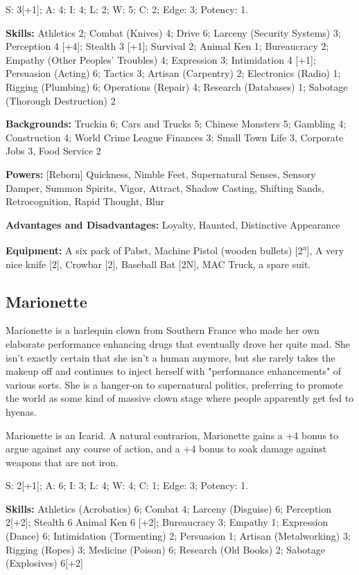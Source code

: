 S: 3[+1]; A: 4; I: 4; L: 2; W: 5; C: 2; Edge: 3; Potency: 1.

\textbf{Skills:} Athletics 2; Combat (Knives) 4; Drive 6; Larceny (Security Systems) 3; Perception 4 [+4]; Stealth 3 [+1]; Survival 2; Animal Ken 1; Bureaucracy 2; Empathy (Other Peoples' Troubles) 4; Expression  3; Intimidation 4 [+1]; Persuasion (Acting) 6; Tactics 3; Artisan (Carpentry) 2; Electronics (Radio) 1; Rigging (Plumbing) 6; Operations (Repair) 4; Research (Databases) 1; Sabotage (Thorough Destruction) 2

\textbf{Backgrounds:} Truckin 6; Cars and Trucks 5; Chinese Monsters 5; Gambling 4; Construction 4; World Crime League Finances 3; Small Town Life 3, Corporate Jobs 3, Food Service 2

\textbf{Powers:} [Reborn] Quickness, Nimble Feet, Supernatural Senses, Sensory Damper, Summon Spirits, Vigor, Attract, Shadow Casting, Shifting Sands, Retrocognition, Rapid Thought, Blur

\textbf{Advantages and Disadvantages:} Loyalty, Haunted, Distinctive Appearance

\textbf{Equipment:} A six pack of Pabst, Machine Pistol (wooden bullets) [2\textsuperscript{a}], A very nice knife [2], Crowbar [2], Baseball Bat [2N], MAC Truck, a spare suit.

\subsection{Marionette}
\hspace{\parindent} Marionette is a harlequin clown from Southern France who made her own elaborate performance enhancing drugs that eventually drove her quite mad. She isn't exactly certain that she isn't a human anymore, but she rarely takes the makeup off and continues to inject herself with "performance enhancements" of various sorts. She is a hanger-on to supernatural politics, preferring to promote the world as some kind of massive clown stage where people apparently get fed to hyenas.

Marionette is an Icarid. A natural contrarion, Marionette gains a +4 bonus to argue against any course of action, and a +4 bonus to soak damage against weapons that are not iron.

S: 2[+1]; A: 6; I: 3; L: 4; W: 4; C: 1; Edge: 3; Potency: 1.

\textbf{Skills:} Athletics (Acrobatics) 6; Combat 4; Larceny (Disguise) 6; Perception 2[+2]; Stealth 6
Animal Ken 6 [+2]; Bureaucracy 3; Empathy 1; Expression  (Dance) 6; Intimidation (Tormenting) 2; Persuasion 1;
Artisan (Metalworking) 3; Rigging (Ropes) 3; Medicine (Poison) 6; Research (Old Books) 2; Sabotage (Explosives) 6[+2]


